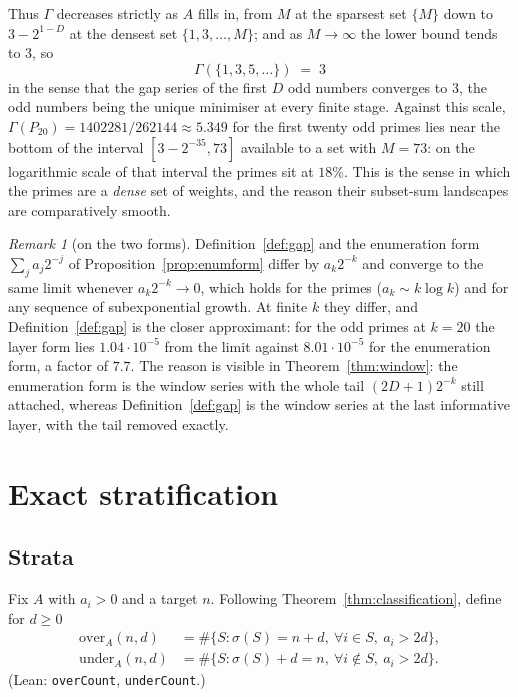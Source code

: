 \documentclass[11pt,a4paper]{article}
\theoremstyle{plain}
\theoremstyle{definition}
\theoremstyle{remark}
\newtheorem{remark}[theorem]{Remark}
\newcommand{\ovr}{\mathrm{over}}
\newcommand{\undr}{\mathrm{under}}
\newcommand{\Lean}[1]{\texttt{#1}}
\begin{document}
Thus $\Gamma$ decreases strictly as $A$ fills in, from $M$ at the sparsest set
$\{M\}$ down to $3-2^{1-D}$ at the densest set $\{1,3,\dots,M\}$; and as
$M\to\infty$ the lower bound tends to $3$, so
\[
  \Gamma(\{1,3,5,\dots\})\;=\;3
\]
in the sense that the gap series of the first $D$ odd numbers converges to $3$,
the odd numbers being the unique minimiser at every finite stage. Against this
scale, $\Gamma(P_{20})=1402281/262144\approx5.349$ for the first twenty odd
primes lies near the bottom of the interval $[3-2^{-35},73]$ available to a set
with $M=73$: on the logarithmic scale of that interval the primes sit at
$18\%$. This is the sense in which the primes are a \emph{dense} set of weights,
and the reason their subset-sum landscapes are comparatively smooth.

\begin{remark}[on the two forms]\label{rem:convergence}
Definition~\ref{def:gap} and the enumeration form
$\sum_ja_j2^{-j}$ of Proposition~\ref{prop:enumform} differ by $a_k2^{-k}$ and
converge to the same limit whenever $a_k2^{-k}\to0$, which holds for the primes
($a_k\sim k\log k$) and for any sequence of subexponential growth. At finite
$k$ they differ, and Definition~\ref{def:gap} is the closer approximant: for the
odd primes at $k=20$ the layer form lies $1.04\cdot10^{-5}$ from the limit
against $8.01\cdot10^{-5}$ for the enumeration form, a factor of $7.7$. The
reason is visible in Theorem~\ref{thm:window}: the enumeration form is the
window series with the whole tail $(2D+1)2^{-k}$ still attached, whereas
Definition~\ref{def:gap} is the window series at the last informative layer,
with the tail removed exactly.
\end{remark}

\section{Exact stratification}\label{sec:stratification}

\subsection{Strata}

Fix $A$ with $a_i>0$ and a target $n$. Following
Theorem~\ref{thm:classification}, define for $d\ge0$
\begin{align*}
  \ovr_A(n,d)&=\#\{S:\sigma(S)=n+d,\ \forall i\in S,\ a_i>2d\},\\
  \undr_A(n,d)&=\#\{S:\sigma(S)+d=n,\ \forall i\notin S,\ a_i>2d\}.
\end{align*}
(Lean: \Lean{overCount}, \Lean{underCount}.)
\end{document}
